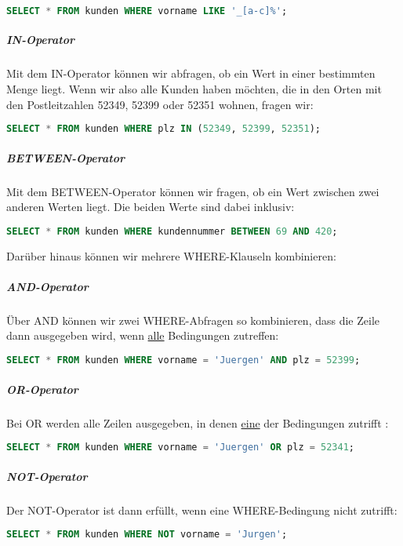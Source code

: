 \documentclass{article}
\begin{document}
	\begin{lstlisting}[language=SQL]
	SELECT * FROM kunden WHERE vorname LIKE '_[a-c]%';
	\end{lstlisting}

	\subparagraph{IN-Operator}
	Mit dem IN-Operator können wir abfragen, ob ein Wert in einer bestimmten Menge liegt. Wenn wir also alle Kunden haben möchten, die in den Orten mit den Postleitzahlen 52349, 52399 oder 52351 wohnen, fragen wir:

	\begin{lstlisting}[language=SQL]
	SELECT * FROM kunden WHERE plz IN (52349, 52399, 52351);
	\end{lstlisting}

	\subparagraph{BETWEEN-Operator}
	Mit dem BETWEEN-Operator können wir fragen, ob ein Wert zwischen zwei anderen Werten liegt. Die beiden Werte sind dabei inklusiv:

	\begin{lstlisting}[language=SQL]
	SELECT * FROM kunden WHERE kundennummer BETWEEN 69 AND 420;
	\end{lstlisting}

	Darüber hinaus können wir mehrere WHERE-Klauseln kombinieren:

	\subparagraph{AND-Operator}
	Über AND können wir zwei WHERE-Abfragen so kombinieren, dass die Zeile dann ausgegeben wird, wenn \underline{alle} Bedingungen zutreffen:

	\begin{lstlisting}[language=SQL, caption=Abfrage aller Kunden namens "Jürgen" in 52399]
	SELECT * FROM kunden WHERE vorname = 'Juergen' AND plz = 52399;
	\end{lstlisting}

	\subparagraph{OR-Operator}
	Bei OR werden alle Zeilen ausgegeben, in denen \underline{eine} der Bedingungen zutrifft :

	\begin{lstlisting}[language=SQL, caption=Abfrage aller Kunden mit Vorname "Jürgen" oder PLZ 52341]
	SELECT * FROM kunden WHERE vorname = 'Juergen' OR plz = 52341;
	\end{lstlisting}

	\subparagraph{NOT-Operator}
	Der NOT-Operator ist dann erfüllt, wenn eine WHERE-Bedingung nicht zutrifft:

	\begin{lstlisting}[language=SQL]
	SELECT * FROM kunden WHERE NOT vorname = 'Jurgen';
	\end{lstlisting}
\end{document}
